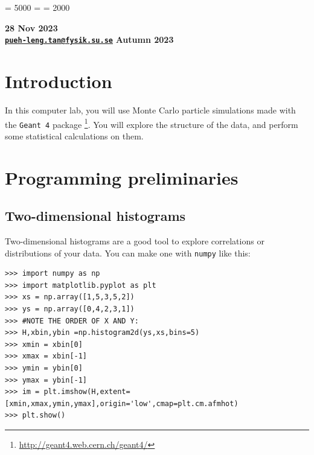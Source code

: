 \documentclass[11pt,a4paper]{exam}
\begin{document}
\tolerance = 5000 %
\hbadness = \tolerance %
\pretolerance = 2000 %

\linespread{1.3} %

\newcommand{\ud}{\mathrm{d}} %
\renewcommand{\vec}[1]{\mathbf{#1}} %
\long{} 


{}
{\bfseries\large 28 Nov 2023\\ 
\href{mailto:pueh-leng.tan@fysik.su.se?Subject=FK7061}{\nolinkurl{pueh-leng.tan@fysik.su.se}}}
{}
{\bfseries Autumn 2023}

\headrule



\section*{Introduction}
In this computer lab, you will use Monte Carlo particle simulations made with the \texttt{Geant 4} package \footnote{\url{http://geant4.web.cern.ch/geant4/}}. You will explore the structure of the data, and perform some statistical calculations on them. 

\section{Programming preliminaries}
\subsection{Two-dimensional histograms}
Two-dimensional histograms are a good tool to explore correlations or distributions of your data. You can make one with \texttt{numpy} like this: 
\begin{lstlisting}
>>> import numpy as np
>>> import matplotlib.pyplot as plt
>>> xs = np.array([1,5,3,5,2])
>>> ys = np.array([0,4,2,3,1])
>>> #NOTE THE ORDER OF X AND Y:
>>> H,xbin,ybin =np.histogram2d(ys,xs,bins=5)
>>> xmin = xbin[0]
>>> xmax = xbin[-1]
>>> ymin = ybin[0]
>>> ymax = ybin[-1]
>>> im = plt.imshow(H,extent=[xmin,xmax,ymin,ymax],origin='low',cmap=plt.cm.afmhot)
>>> plt.show()
\end{lstlisting}
\end{document}
